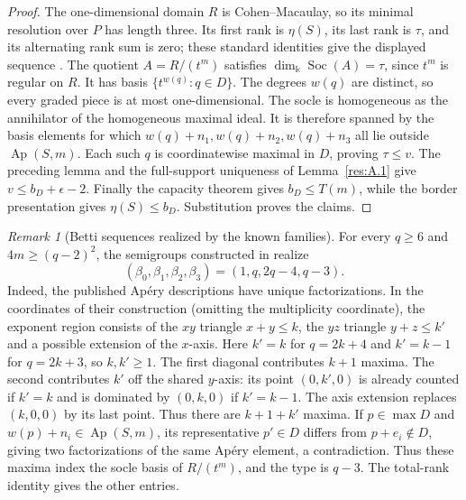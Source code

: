\documentclass[11pt]{article}
\theoremstyle{definition}
\theoremstyle{remark}
\newtheorem{remark}[theorem]{Remark}
\theoremstyle{plain}
\DeclareMathOperator{\Ap}{Ap}
\begin{document}
\begin{proof}
The one-dimensional domain $R$ is Cohen--Macaulay, so its minimal
resolution over $P$ has length three.  Its first rank is $\eta(S)$,
its last rank is $\tau$, and its alternating rank sum is zero; these
standard identities give the displayed sequence
\cite[Section~1]{MSSurvey25}.
The quotient $A=R/(t^m)$ satisfies $\dim_{\Bbbk}\operatorname{Soc}(A)=\tau$, since $t^m$ is regular on $R$. It has basis
$\{t^{w(q)}:q\in D\}$.
The degrees $w(q)$ are distinct, so every graded piece is at most
one-dimensional. The socle is homogeneous as the annihilator of the
homogeneous maximal ideal. It is therefore spanned by the basis elements for which
$w(q)+n_1,w(q)+n_2,w(q)+n_3$ all lie outside $\operatorname{Ap}(S,m)$.
Each such $q$ is coordinatewise maximal in $D$, proving $\tau\le v$.
The preceding lemma and the full-support uniqueness of Lemma~\ref{res:A.1} give
$v\le b_D+\epsilon-2$.  Finally the capacity theorem gives $b_D\le T(m)$,
while the border presentation gives $\eta(S)\le b_D$.
Substitution proves the claims. \end{proof}

\begin{remark}[Betti sequences realized by the known families]\label{rem:betti-family}
For every $q\ge6$ and $4m\ge(q-2)^2$, the semigroups constructed in
\cite[Theorem~6.3]{EHOOPK24} realize
\[
(\beta_0,\beta_1,\beta_2,\beta_3)=(1,q,2q-4,q-3).
\]
Indeed, the published Ap\'ery descriptions have unique factorizations.
In the coordinates of their construction (omitting the multiplicity
coordinate), the exponent region consists of the $xy$ triangle
$x+y\le k$, the $yz$ triangle $y+z\le k'$ and a possible extension
of the $x$-axis. Here $k'=k$ for $q=2k+4$ and $k'=k-1$ for $q=2k+3$,
so $k,k'\ge1$. The first diagonal contributes $k+1$ maxima.
The second contributes $k'$ off the shared $y$-axis: its point
$(0,k',0)$ is already counted if $k'=k$ and is dominated by $(0,k,0)$
if $k'=k-1$. The axis extension
replaces $(k,0,0)$ by its last point. Thus there are $k+1+k'$
maxima. If $p\in\max D$ and $w(p)+n_i\in\Ap(S,m)$, its
representative $p'\in D$ differs from $p+e_i\notin D$, giving two
factorizations of the same Ap\'ery element, a contradiction.
Thus these maxima index the socle basis of $R/(t^m)$, and the type is $q-3$.
The total-rank identity gives the other entries.
\end{remark}
\end{document}
